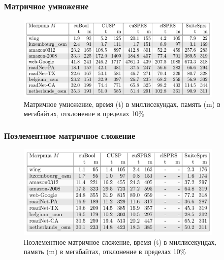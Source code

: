 \documentclass[xcolor=table,english]{beamer}
\begin{document}
\begin{frame}[fragile] \frametitle{Матричное умножение}
    \begin{center}
     \begin{minipage}[m]{0.93\linewidth}
        \begin{figure}
            \centering
            \includegraphics[width=0.9\textwidth]{figures/results_1_rq1.png}
            \caption{Матричное умножение, время (t) в миллисекундах, память (m) в мегабайтах, отклонение в пределах 10\%}
        \end{figure}
    \end{minipage}\hfill   
    \end{center}
\end{frame}

\begin{frame}[fragile] \frametitle{Поэлементное матричное сложение}
    \begin{center}
     \begin{minipage}[m]{0.93\linewidth}
        \begin{figure}
            \centering
            \includegraphics[width=0.9\textwidth]{figures/results_2_rq1.png}
            \caption{Поэлементное матричное сложение, время (t) в миллисекундах, память (m) в мегабайтах, отклонение в пределах 10\%}
        \end{figure}
    \end{minipage}\hfill   
    \end{center}
\end{frame}
\end{document}
